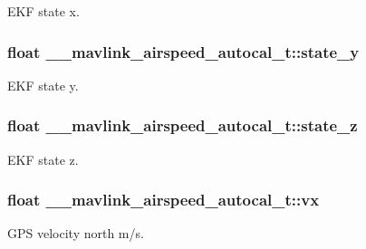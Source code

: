 E\+K\+F state x. 

\hypertarget{struct____mavlink__airspeed__autocal__t_a5ce1c55997cac6df57f5214db659ae73}{
\subsubsection[{state\+\_\+y}]{\setlength{\rightskip}{0pt plus 5cm}float \+\_\+\+\_\+mavlink\+\_\+airspeed\+\_\+autocal\+\_\+t\+::state\+\_\+y}}\label{struct____mavlink__airspeed__autocal__t_a5ce1c55997cac6df57f5214db659ae73}


E\+K\+F state y. 

\hypertarget{struct____mavlink__airspeed__autocal__t_a46e4fe94091718709f52c904795eca11}{
\subsubsection[{state\+\_\+z}]{\setlength{\rightskip}{0pt plus 5cm}float \+\_\+\+\_\+mavlink\+\_\+airspeed\+\_\+autocal\+\_\+t\+::state\+\_\+z}}\label{struct____mavlink__airspeed__autocal__t_a46e4fe94091718709f52c904795eca11}


E\+K\+F state z. 

\hypertarget{struct____mavlink__airspeed__autocal__t_a9488f3313ddf0182b79dc35efcd0b98c}{
\subsubsection[{vx}]{\setlength{\rightskip}{0pt plus 5cm}float \+\_\+\+\_\+mavlink\+\_\+airspeed\+\_\+autocal\+\_\+t\+::vx}}\label{struct____mavlink__airspeed__autocal__t_a9488f3313ddf0182b79dc35efcd0b98c}


G\+P\+S velocity north m/s. 


